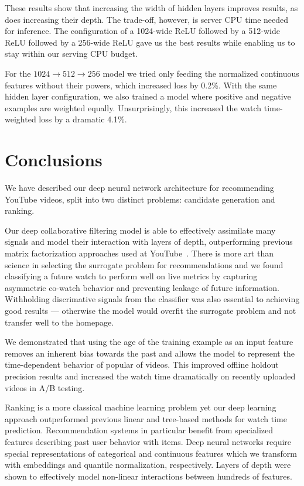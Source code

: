 These results show that increasing the width of hidden layers improves
results, as does increasing their depth. The trade-off, however, is server
CPU time needed for inference. The configuration of a 1024-wide ReLU
followed by a 512-wide ReLU followed by a 256-wide ReLU gave us the best
results while enabling us to stay within our serving CPU budget.

For the $1024 \rightarrow 512 \rightarrow 256$ model we tried only feeding
the normalized continuous features without their powers, which increased
loss by 0.2\%. With the same hidden layer configuration, we also trained a
model where positive and negative examples are weighted equally.
Unsurprisingly, this increased the watch time-weighted loss by a dramatic
4.1\%.

\section{Conclusions}

We have described our deep neural network architecture for recommending
YouTube videos, split into two distinct problems: candidate generation and
ranking.

Our deep collaborative filtering model is able to effectively assimilate
many signals and model their interaction with layers of depth, outperforming
previous matrix factorization approaches used at
YouTube~\cite{weston2011wsabie}. There is more art than science in selecting
the surrogate problem for recommendations and we found classifying a future
watch to perform well on live metrics by capturing asymmetric co-watch
behavior and preventing leakage of future information. Withholding
discrimative signals from the classifier was also essential to achieving
good results --- otherwise the model would overfit the surrogate problem and
not transfer well to the homepage.

We demonstrated that using the age of the training example as an input
feature removes an inherent bias towards the past and allows the model to
represent the time-dependent behavior of popular of videos. This improved
offline holdout precision results and increased the watch time dramatically
on recently uploaded videos in A/B testing.

Ranking is a more classical machine learning problem yet our deep learning
approach outperformed previous linear and tree-based methods for watch time
prediction. Recommendation systems in particular benefit from specialized
features describing past user behavior with items. Deep neural networks
require special representations of categorical and continuous features which
we transform with embeddings and quantile normalization, respectively.
Layers of depth were shown to effectively model non-linear interactions
between hundreds of features.

